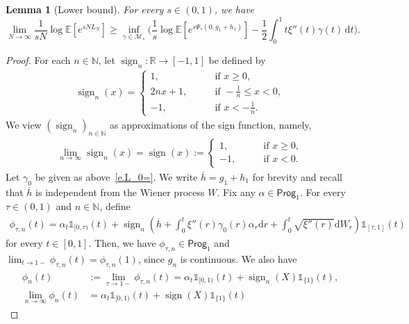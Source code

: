 \documentclass[11pt]{amsart}
\newtheorem{lemma}[proposition]{Lemma}
\theoremstyle{remark}
\theoremstyle{definition}
\numberwithin{equation}{section}
\numberwithin{proposition}{section}
\numberwithin{figure}{section}
\numberwithin{table}{section}
\newcommand{\N}{\mathbb{N}}
\newcommand{\R}{\mathbb{R}}
\newcommand{\E}{\mathbb{E}}
\renewcommand{\leq}{\leqslant}
\renewcommand{\geq}{\geqslant}
\renewcommand{\bar}{\overline}
\newcommand{\Ll}{\left}
\newcommand{\Rr}{\right}
\renewcommand{\d}{\mathrm{d}}
\newcommand{\1}{\mathbf{1}}
\DeclareMathOperator{\sign}{sign}
\newcommand{\prog}{\mathsf{Prog}}
\newcommand{\cM}{\mathcal{M}}
\begin{document}
\begin{lemma}[Lower bound]\label{l.laplace_>}
For every $s \in (0,1)$, we have
\begin{equation}
\label{e.laplace_>}
\lim_{N\to \infty} \frac{1}{sN} \log \E \Ll[ e^{sN L_N} \Rr]   \geq  \inf_{\gamma \in \cM_{s }}\bigg( \frac 1 s \log \E\Ll[e^{s\Psi_{\gamma}(0,g_1+h_1)}\Rr] - \frac{1}{2} \int_0^1 t \xi''(t) \gamma(t) \, \d t \bigg).
\end{equation}
\end{lemma}


\begin{proof}
For each $n\in \N$, let $\sign_n:\R\to[-1,1]$ be defined by
\begin{align*}
    \sign_n(x) = 
    \begin{cases}
        1, \qquad &\text{if }x\geq 0,
        \\
        2nx + 1, \qquad &\text{if } -\frac{1}{n}\leq x<0,
        \\
        -1, \qquad &\text{if } x<-\frac{1}{n}.
    \end{cases}
\end{align*}
We view $(\sign_n)_{n\in\N}$ as approximations of the sign function, namely,
\begin{align*}
    \lim_{n\to\infty} \sign_n(x) = \sign(x):=
    \begin{cases}
        1  , \qquad &\text{if }x\geq 0,
        \\
        -1 , \qquad &\text{if }x< 0.
    \end{cases}
\end{align*}
Let $\gamma_0$ be given as above~\eqref{e.L_0=}. We write $\bar h= g_1+h_1$ for brevity and recall that $\bar h$ is independent from the Wiener process $W$.
Fix any $\alpha\in\prog_1$. For every $\tau\in(0,1)$ and $n\in\N$, define
\begin{align*}
    \phi_{\tau,n}(t) = \alpha_t\mathds{1}_{[0,\tau)}(t) + \sign_n\Ll(\bar h+\int_0^t\xi''(r)\gamma_0(r)\alpha_r\d r + \int_0^t\sqrt{\xi''(r)}\d W_r\Rr)\mathds{1}_{[\tau,1]}(t)
\end{align*}
for every $t\in[0,1]$. Then, we have $\phi_{\tau,n}\in\prog_1$ and $\lim_{t\to1-}\phi_{\tau,n}(t) = \phi_{\tau,n}(1)$, since $g_n$ is continuous. We also have
\begin{align}\label{e.phi_n...}
\begin{split}
    \phi_n(t) &:=\lim_{\tau\to1-}\phi_{\tau,n}(t)=\alpha_t\mathds{1}_{[0,1)}(t)+\sign_n(X)\mathds{1}_{\{1\}}(t),
    \\
    \lim_{n\to\infty}\phi_n(t) &= \alpha_t\mathds{1}_{[0,1)}(t)+\sign(X)\mathds{1}_{\{1\}}(t)

\end{split}
\end{align}
\end{proof}
\end{document}
